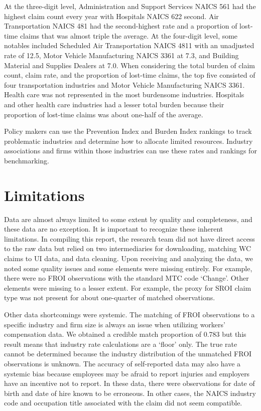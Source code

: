\documentclass[9pt, oneside]{article}   	%
\begin{document}
At the three-digit level, Administration and Support Services NAICS 561 had the highest claim count every year with Hospitals NAICS 622 second. Air Transportation NAICS 481 had the second-highest rate and a proportion of lost-time claims that was almost triple the average. At the four-digit level, some notables included Scheduled Air Transportation NAICS 4811 with an unadjusted rate of 12.5, Motor Vehicle Manufacturing NAICS 3361 at 7.3, and Building Material and Supplies Dealers at 7.0. When considering the total burden of claim count, claim rate, and the proportion of lost-time claims, the top five consisted of four transportation industries and Motor Vehicle Manufacturing NAICS 3361. Health care was not represented in the most burdensome industries. Hospitals and other health care industries had a lesser total burden because their proportion of lost-time claims was about one-half of the average.

Policy makers can use the Prevention Index and Burden Index rankings to track problematic industries and determine how to allocate limited resources. Industry associations and firms within those industries can use these rates and rankings for benchmarking. 



\section{Limitations}

Data are almost always limited to some extent by quality and completeness, and these data are no exception. It is important to recognize these inherent limitations. In compiling this report, the research team did not have direct access to the raw data but relied on two intermediaries for downloading, matching WC claims to UI data, and data cleaning. Upon receiving and analyzing the data, we noted some quality issues and some elements were missing entirely. For example, there were no FROI observations with the standard MTC code  `Change'. Other elements were missing to a lesser extent. For example, the proxy for SROI claim type was not present for about one-quarter of matched observations. 

Other data shortcomings were systemic.  The matching of FROI observations to a specific industry and firm size is always an issue when utilizing workers' compensation data. We obtained a credible match proportion of 0.783 but this result means that industry rate calculations are a `floor' only. The true rate cannot be determined because the industry distribution of the unmatched FROI observations is unknown. The accuracy of self-reported data may also have a systemic bias because employees may be afraid to report injuries and employers have an incentive not to report. In these data, there were observations for date of birth and date of hire known to be erroneous. In other cases, the NAICS industry code and occupation title associated with the claim did not seem compatible. 
\end{document}
